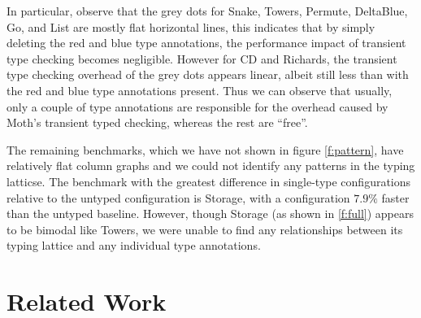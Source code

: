 \documentclass[sigplan,10pt,review,screen]{acmart}\settopmatter{printfolios=true}
\begin{document}
In particular, observe that the grey dots for Snake, Towers, Permute, DeltaBlue, Go, and List are mostly flat horizontal lines, this indicates that by simply deleting the red and blue type annotations, the performance impact of transient type checking becomes negligible. However for CD and Richards, the transient type checking overhead of the grey dots appears linear, albeit still less than with the red and blue type annotations present. Thus we can observe that usually, only a couple of type annotations are responsible for the overhead caused by Moth's transient typed checking, whereas the rest are ``free''.

The remaining benchmarks, which we have not shown in figure \ref{f:pattern}, have relatively flat column graphs and we could not identify any patterns in the typing latticse. The benchmark with the greatest difference in single-type configurations relative to the untyped configuration is Storage, with a configuration $7.9\%$ faster than the untyped baseline. However, though Storage (as shown in \ref{f:full}) appears to be bimodal like Towers, we were unable to find any relationships between its typing lattice and any individual type annotations.


\section{Related Work}
\label{s-rel}
\end{document}
